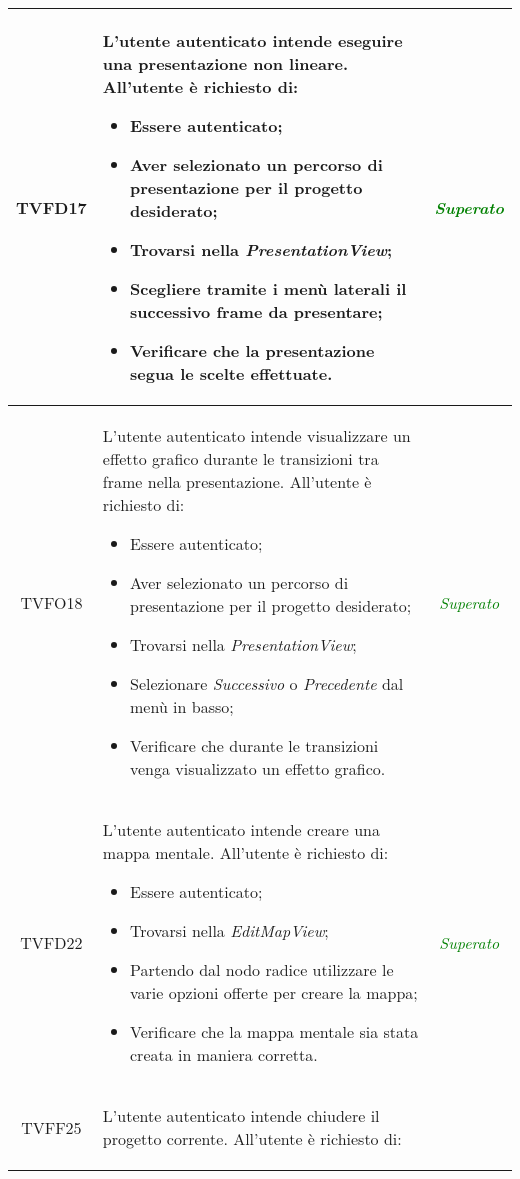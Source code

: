\begin{longtable}{|c|>{}m{8cm}|c|}
\hypertarget{TVFD17}{TVFD17} &  L'utente autenticato intende eseguire una presentazione non lineare.
All'utente è richiesto di:
\begin{itemize}
	\item Essere autenticato;
	\item Aver selezionato un percorso di presentazione per il progetto desiderato;
	\item Trovarsi nella \textit{PresentationView};
	\item Scegliere tramite i menù laterali il successivo frame da presentare;
	\item Verificare che la presentazione segua le scelte effettuate.
\end{itemize} & \textcolor{Green}{\textit{Superato}}\\ \hline
\hypertarget{TVFO18}{TVFO18} & L'utente autenticato intende visualizzare un effetto grafico durante le transizioni tra frame nella presentazione.
All'utente è richiesto di:
\begin{itemize}
	\item Essere autenticato;
	\item Aver selezionato un percorso di presentazione per il progetto desiderato;
	\item Trovarsi nella \textit{PresentationView};
	\item Selezionare \textit{Successivo} o \textit{Precedente} dal menù in basso;
	\item Verificare che durante le transizioni venga visualizzato un effetto grafico.
\end{itemize} & \textcolor{Green}{\textit{Superato}}\\ \hline
\hypertarget{TVFD22}{TVFD22} &  L'utente autenticato intende creare una mappa mentale.
All'utente è richiesto di:
\begin{itemize}
	\item Essere autenticato;
	\item Trovarsi nella \textit{EditMapView};
	\item Partendo dal nodo radice utilizzare le varie opzioni offerte per creare la mappa;
	\item Verificare che la mappa mentale sia stata creata in maniera corretta.
\end{itemize} & \textcolor{Green}{\textit{Superato}}\\ \hline
\hypertarget{TVFF25}{TVFF25} &  L'utente autenticato intende chiudere il progetto corrente.
All'utente è richiesto di:
\begin{itemize}

\end{itemize}
\end{longtable}
